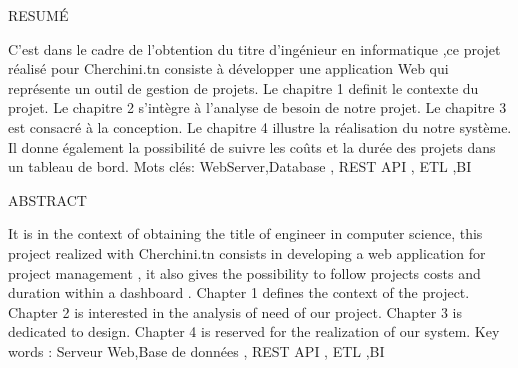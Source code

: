 \bigskip

RESUM\'E
\bigskip
\newline

C'est dans le cadre de l'obtention du titre d'ing\'{e}nieur en informatique
,ce projet  r\'{e}alis\'{e} pour Cherchini.tn consiste \`{a} d\'{e}velopper une application Web qui repr\'{e}sente un
outil de gestion de projets.
Le chapitre 1 definit le contexte du projet. Le chapitre 2 s'int\`{e}gre \`{a} l'analyse de besoin
de notre projet. Le chapitre 3 est consacr\'{e} \`{a} la conception. Le chapitre 4 illustre la
r\'{e}alisation du notre syst\`{e}me.
Il donne également la possibilité de suivre les coûts et la durée des projets dans un tableau de bord.
\newline
\bigskip
Mots cl\'{e}s: WebServer,Database , REST API , ETL ,BI


\bigskip
\bigskip
\bigskip
\bigskip


ABSTRACT
\bigskip
\newline

It is in the context of obtaining the title of engineer in computer science, this project
realized with Cherchini.tn consists in developing a web application  for project management ,
it also gives the possibility to follow projects costs and duration within a dashboard .
Chapter 1 defines the context of the project. Chapter 2 is interested in the analysis of
need of our project. Chapter 3 is dedicated to design. Chapter 4 is reserved for the
realization of our system.
\newline
\bigskip
Key words : Serveur Web,Base de donn\'{e}es , REST API , ETL ,BI 